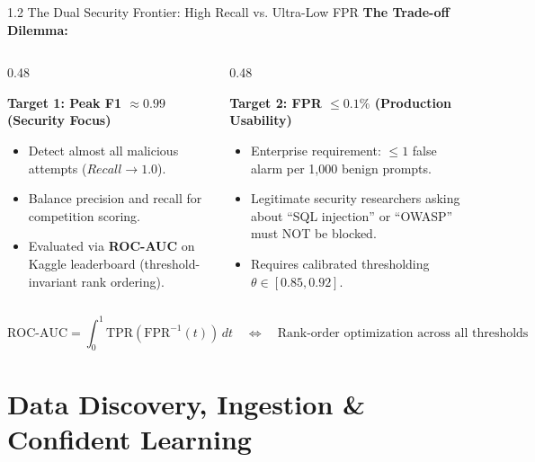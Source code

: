 \documentclass[aspectratio=169]{beamer}
\begin{document}
\begin{frame}{1.2 The Dual Security Frontier: High Recall vs. Ultra-Low FPR}
\textbf{The Trade-off Dilemma:}

\vspace{0.2cm}
\begin{columns}[T]
\begin{column}{0.48\textwidth}
\begin{block}{\textbf{Target 1: Peak F1 $\approx 0.99$ (Security Focus)}}
\begin{itemize}
    \item Detect almost all malicious attempts ($Recall \to 1.0$).
    \item Balance precision and recall for competition scoring.
    \item Evaluated via \textbf{ROC-AUC} on Kaggle leaderboard (threshold-invariant rank ordering).
\end{itemize}
\end{block}
\end{column}

\begin{column}{0.48\textwidth}
\begin{block}{\textbf{Target 2: FPR $\le 0.1\%$ (Production Usability)}}
\begin{itemize}
    \item Enterprise requirement: $\le 1$ false alarm per 1,000 benign prompts.
    \item Legitimate security researchers asking about ``SQL injection'' or ``OWASP'' must NOT be blocked.
    \item Requires calibrated thresholding $\theta \in [0.85, 0.92]$.
\end{itemize}
\end{block}
\end{column}
\end{columns}

\vspace{0.3cm}
$$\text{ROC-AUC} = \int_0^1 \text{TPR}(\text{FPR}^{-1}(t)) \, dt \quad \Longleftrightarrow \quad \text{Rank-order optimization across all thresholds}$$
\end{frame}

\section{Data Discovery, Ingestion \& Confident Learning}
\end{document}
